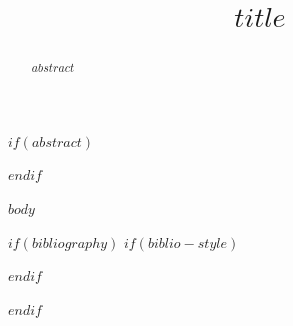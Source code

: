 \documentclass{article}
\title{$title$}
\begin{document}
\maketitle

$if(abstract)$
\begin{abstract}
$abstract$
\end{abstract}
$endif$

$body$

$if(bibliography)$
$if(biblio-style)$

$endif$

$endif$
\end{document}

